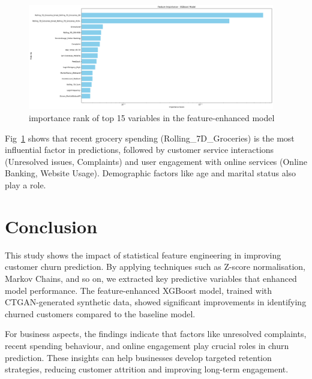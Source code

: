 \documentclass[journal=gmj]{CUP-JNL-DTM}%
\theoremstyle{definition}
\numberwithin{equation}{section}
\begin{document}
\begin{figure}[h]
    \centering
    \includegraphics[width=0.96\textwidth]{Plots/importance_rank.png}
    \caption{importance rank of top 15 variables in the feature-enhanced model}
    \label{fig:rank}
\end{figure}

Fig~\ref{fig:rank} shows that recent grocery spending (Rolling\_7D\_Groceries) is the most influential factor in predictions, followed by customer service interactions (Unresolved issues, Complaints) and user engagement with online services (Online Banking, Website Usage). Demographic factors like age and marital status also play a role. 







\section{Conclusion}

This study shows the impact of statistical feature engineering in improving customer churn prediction. By applying techniques such as Z-score normalisation, Markov Chains, and so on, we extracted key predictive variables that enhanced model performance. The feature-enhanced XGBoost model, trained with CTGAN-generated synthetic data, showed significant improvements in identifying churned customers compared to the baseline model.

For business aspects, the findings indicate that factors like unresolved complaints, recent spending behaviour, and online engagement play crucial roles in churn prediction. These insights can help businesses develop targeted retention strategies, reducing customer attrition and improving long-term engagement.




\end{document}
